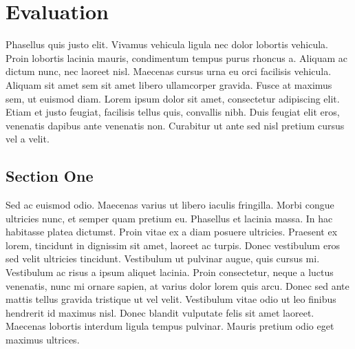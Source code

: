 \chapter{Evaluation\label{ch:evaluation}}
  Phasellus quis justo elit. Vivamus vehicula ligula nec dolor lobortis vehicula. Proin lobortis lacinia mauris, condimentum tempus purus rhoncus a. Aliquam ac dictum nunc, nec laoreet nisl. Maecenas cursus urna eu orci facilisis vehicula. Aliquam sit amet sem sit amet libero ullamcorper gravida. Fusce at maximus sem, ut euismod diam. Lorem ipsum dolor sit amet, consectetur adipiscing elit. Etiam et justo feugiat, facilisis tellus quis, convallis nibh. Duis feugiat elit eros, venenatis dapibus ante venenatis non. Curabitur ut ante sed nisl pretium cursus vel a velit.
  \pagebreak

  \section{Section One\label{sec:eval-one}}
    Sed ac euismod odio. Maecenas varius ut libero iaculis fringilla. Morbi congue ultricies nunc, et semper quam pretium eu. Phasellus et lacinia massa. In hac habitasse platea dictumst. Proin vitae ex a diam posuere ultricies. Praesent ex lorem, tincidunt in dignissim sit amet, laoreet ac turpis. Donec vestibulum eros sed velit ultricies tincidunt. Vestibulum ut pulvinar augue, quis cursus mi. Vestibulum ac risus a ipsum aliquet lacinia. Proin consectetur, neque a luctus venenatis, nunc mi ornare sapien, at varius dolor lorem quis arcu. Donec sed ante mattis tellus gravida tristique ut vel velit. Vestibulum vitae odio ut leo finibus hendrerit id maximus nisl. Donec blandit vulputate felis sit amet laoreet. Maecenas lobortis interdum ligula tempus pulvinar. Mauris pretium odio eget maximus ultrices.

